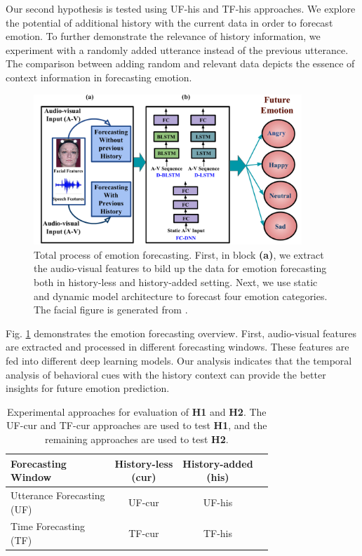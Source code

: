 Our second hypothesis is tested using UF-his and TF-his approaches. We explore the potential of additional history with the current data in order to forecast emotion. To further demonstrate the relevance of history information, we experiment with a randomly added utterance instead of the previous utterance. The comparison between adding random and relevant data depicts the essence of context information in forecasting emotion. 

\begin{figure}
\centering
   \includegraphics[width=0.9\textwidth]{overall.pdf}
\caption[Total process of emotion forecasting]{Total process of emotion forecasting. First, in block \textbf{(a)}, we extract the audio-visual features to bild up the data for emotion forecasting both in history-less and history-added setting. Next, we use static and dynamic model architecture to forecast four emotion categories. The facial figure is generated from \cite{IEMOCAP}.}
\label{fig:overview}
\end{figure}

Fig. \ref{fig:overview} demonstrates the emotion forecasting overview. First, audio-visual features are extracted and processed in different forecasting windows. These features are fed into different deep learning models. Our analysis indicates that the temporal analysis of behavioral cues with the history context can provide the better insights for future emotion prediction. 


\begin{table}[h]
\centering
\caption{Experimental approaches for evaluation of \textbf{H1} and \textbf{H2}. The UF-cur and TF-cur approaches are used to test \textbf{H1}, and the remaining approaches are used to test \textbf{H2}.}
\begin{tabular}{|l||c|c|c||}\hline
\diagbox[width=15em]{\textbf{Forecasting} \\ \textbf{Window}}{\makecell{{}\\\textbf{History}}} &
  \makecell{History-less \\(cur)} & \makecell{History-added \\(his)} \\ \hline
\hline
\makecell{Utterance Forecasting \\ (UF)} & UF-cur & UF-his\\
\hline
\makecell{Time Forecasting\\ (TF)} & TF-cur & TF-his  \\
\hline
\end{tabular}
\label{table:experiments}
\end{table}


